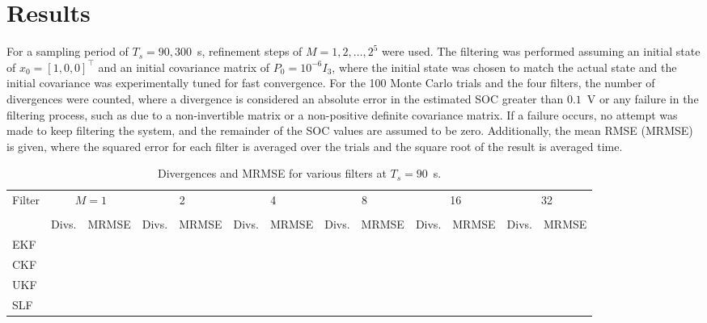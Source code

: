 \documentclass[../zhang_thesis.tex]{subfiles}
\begin{document}
\chapter{Results}


For a sampling period of $T_s=90,300$~s, refinement steps of $M=1,2,\dots,2^5$ were used. The filtering was performed assuming an initial state of $x_0=[1,0,0]^\top$ and an initial covariance matrix of $P_0=10^{-6} I_3$, where the initial state was chosen to match the actual state and the initial covariance was experimentally tuned for fast convergence. For the 100 Monte Carlo trials and the four filters, the number of divergences were counted, where a divergence is considered an absolute error in the estimated SOC greater than $0.1$~V or any failure in the filtering process, such as due to a non-invertible matrix or a non-positive definite covariance matrix. If a failure occurs, no attempt was made to keep filtering the system, and the remainder of
the SOC values are assumed to be zero. Additionally, the mean RMSE (MRMSE) is given, where the squared error for each filter is averaged over
the trials and the square root of the result is averaged time.

\begin{sidewaystable}
\caption{Divergences and MRMSE for various filters at $T_s=90$~s.}
\centering
\begin{tabular}{l*{12}{c}}
\toprule
Filter & \multicolumn{2}{c}{$M=1$} & \multicolumn{2}{c}{2} & \multicolumn{2}{c}{4} & \multicolumn{2}{c}{8} & \multicolumn{2}{c}{16} & \multicolumn{2}{c}{32} \\
\cmidrule(r){2-3} \cmidrule(lr){4-5} \cmidrule(lr){6-7} \cmidrule(lr){8-9} \cmidrule(lr){10-11} \cmidrule(lr){12-13} \\
& Divs. & MRMSE & Divs. & MRMSE & Divs. & MRMSE & Divs. & MRMSE & Divs. & MRMSE & Divs. & MRMSE \\
\midrule
EKF &  \\
CKF &  \\
UKF &  \\
SLF &  \\
\bottomrule
\end{tabular}
\end{sidewaystable}
\end{document}
